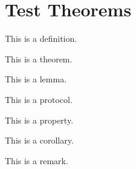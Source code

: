 \documentclass{article}
\begin{document}
\section{Test Theorems}

\begin{definition}
This is a definition.
\end{definition}

\begin{theorem}
This is a theorem.
\end{theorem}

\begin{lemma}
This is a lemma.
\end{lemma}

\begin{protocol}
This is a protocol.
\end{protocol}

\begin{property}
This is a property.
\end{property}

\begin{corollary}
This is a corollary.
\end{corollary}

\begin{remark}
This is a remark.
\end{remark}
\end{document}
